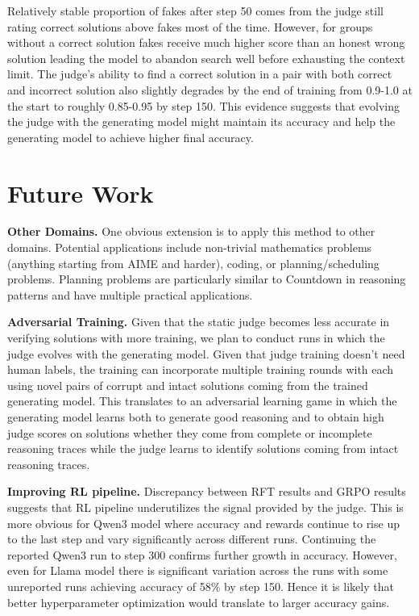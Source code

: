 \documentclass[12pt,a4paper]{article}
\begin{document}
Relatively stable proportion of fakes after step 50 comes from the judge still rating correct solutions above fakes most of the time. However, for groups without a correct solution fakes receive much higher score than an honest wrong solution leading the model to abandon search well before exhausting the context limit. The judge's ability to find a correct solution in a pair with both correct and incorrect solution also slightly degrades by the end of training from 0.9-1.0 at the start to roughly 0.85-0.95 by step 150. This evidence suggests that evolving the judge with the generating model might maintain its accuracy and help the generating model to achieve higher final accuracy.

\vspace{10pt}
\section{Future Work}
\label{sec:future}

\textbf{Other Domains.} One obvious extension is to apply this method to other domains. Potential applications include non-trivial mathematics problems (anything starting from AIME and harder), coding, or planning/scheduling problems. Planning problems are particularly similar to Countdown in reasoning patterns and have multiple practical applications. 

\textbf{Adversarial Training.} Given that the static judge becomes less accurate in verifying solutions with more training, we plan to conduct runs in which the judge evolves with the generating model. Given that judge training doesn't need human labels, the training can incorporate multiple training rounds with each using novel pairs of corrupt and intact solutions coming from the trained generating model. This translates to an adversarial learning game in which the generating model learns both to generate good reasoning and to obtain high judge scores on solutions whether they come from complete or incomplete reasoning traces while the judge learns to identify solutions coming from intact reasoning traces.  

\textbf{Improving RL pipeline.} Discrepancy between RFT results and GRPO results suggests that RL pipeline underutilizes the signal provided by the judge. This is more obvious for Qwen3 model where accuracy and rewards continue to rise up to the last step and vary significantly across different runs.  Continuing the reported Qwen3 run to step 300 confirms further growth in accuracy. However, even for Llama model there is significant variation across the runs with some unreported runs achieving accuracy of 58\% by step 150. Hence it is likely that better hyperparameter optimization would translate to larger accuracy gains.
\end{document}
